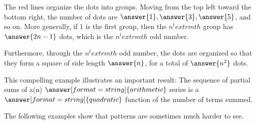 \documentclass[nooutcomes]{ximera}
\begin{document}
\begin{problem}
\begin{problem}
\begin{problem}
The red lines organize the dots into groups. Moving from the top left toward the bottom right, the number of dots are $\answer{1},\answer{3},\answer{5}$, and so on.  More generally, if $1$ is the first group, then the $n^textrm{th}$ group has $\answer{2n-1}$ dots, which is the $n^textrm{th}$ odd number.  

Furthermore, through the $n^textrm{th}$ odd number, the dots are organized so that they form a square of side length $\answer{n}$, for a total of $\answer{n^2}$ dots.  

This compelling example illustrates an important result:  The sequence of partial sums of a(n) $\answer[format=string]{arithmetic}$ series is a $\answer[format=string]{quadratic}$ function of the number of terms summed.  

The following examples show that patterns are sometimes much harder to see.  
\end{problem}
\end{problem}
\end{problem}
\end{document}
